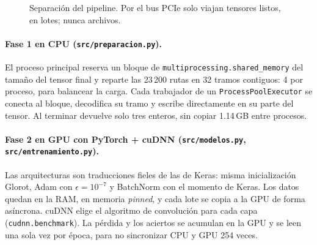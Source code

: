 \documentclass[11pt,letterpaper]{article}
\newcommand{\cod}[1]{\texttt{#1}}
\begin{document}
\begin{figure}[H]\centering
{}
\caption{Separación del pipeline. Por el bus PCIe solo viajan tensores listos, en lotes; nunca archivos.}
\end{figure}

\paragraph{Fase 1 en CPU (\cod{src/preparacion.py}).}
El proceso principal reserva un bloque de \cod{multiprocessing.shared\_memory} del tamaño del tensor final y reparte las 23\,200 rutas en 32 tramos contiguos: 4 por proceso, para balancear la carga. Cada trabajador de un \cod{ProcessPoolExecutor} se conecta al bloque, decodifica su tramo y escribe directamente en su parte del tensor. Al terminar devuelve solo tres enteros, sin copiar 1.14\,GB entre procesos.

\paragraph{Fase 2 en GPU con PyTorch + cuDNN (\cod{src/modelos.py}, \cod{src/entrenamiento.py}).}
Las arquitecturas son traducciones fieles de las de Keras: misma inicialización Glorot, Adam con $\epsilon=10^{-7}$ y BatchNorm con el momento de Keras. Los datos quedan en la RAM, en memoria \textit{pinned}, y cada lote se copia a la GPU de forma asíncrona. cuDNN elige el algoritmo de convolución para cada capa (\cod{cudnn.benchmark}). La pérdida y los aciertos se acumulan en la GPU y se leen una sola vez por época, para no sincronizar CPU y GPU 254 veces.
\end{document}
